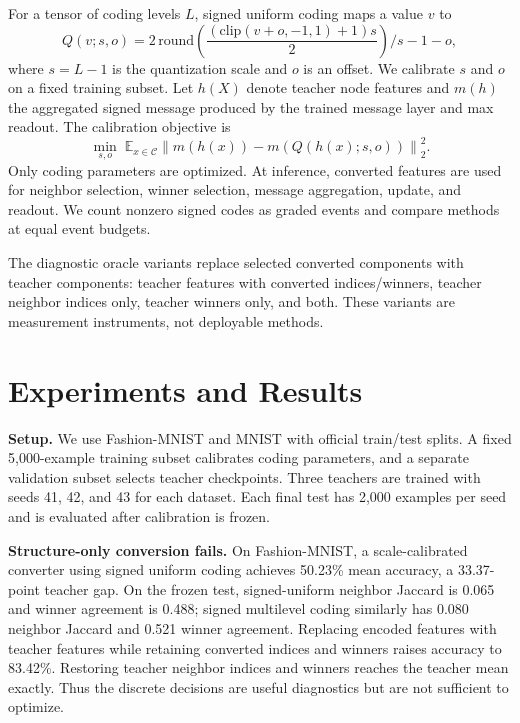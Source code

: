\documentclass[10pt,twocolumn]{article}
\begin{document}
For a tensor of coding levels $L$, signed uniform coding maps a value $v$ to
\begin{equation}
Q(v;s,o)=2\,\mathrm{round}\!\left(\frac{(\mathrm{clip}(v+o,-1,1)+1)s}{2}\right)/s-1-o ,
\end{equation}
where $s=L-1$ is the quantization scale and $o$ is an offset. We calibrate $s$ and $o$ on a fixed training subset. Let $h(X)$ denote teacher node features and $m(h)$ the aggregated signed message produced by the trained message layer and max readout. The calibration objective is
\begin{equation}
\min_{s,o}\; \mathbb{E}_{x\in\mathcal{C}}\left\|m(h(x))-m(Q(h(x);s,o))\right\|_2^2 .
\end{equation}
Only coding parameters are optimized. At inference, converted features are used for neighbor selection, winner selection, message aggregation, update, and readout. We count nonzero signed codes as graded events and compare methods at equal event budgets.

The diagnostic oracle variants replace selected converted components with teacher components: teacher features with converted indices/winners, teacher neighbor indices only, teacher winners only, and both. These variants are measurement instruments, not deployable methods.

\section{Experiments and Results}
\textbf{Setup.} We use Fashion-MNIST and MNIST with official train/test splits. A fixed 5,000-example training subset calibrates coding parameters, and a separate validation subset selects teacher checkpoints. Three teachers are trained with seeds 41, 42, and 43 for each dataset. Each final test has 2,000 examples per seed and is evaluated after calibration is frozen.

\textbf{Structure-only conversion fails.} On Fashion-MNIST, a scale-calibrated converter using signed uniform coding achieves 50.23\% mean accuracy, a 33.37-point teacher gap. On the frozen test, signed-uniform neighbor Jaccard is 0.065 and winner agreement is 0.488; signed multilevel coding similarly has 0.080 neighbor Jaccard and 0.521 winner agreement. Replacing encoded features with teacher features while retaining converted indices and winners raises accuracy to 83.42\%. Restoring teacher neighbor indices and winners reaches the teacher mean exactly. Thus the discrete decisions are useful diagnostics but are not sufficient to optimize.
\end{document}
